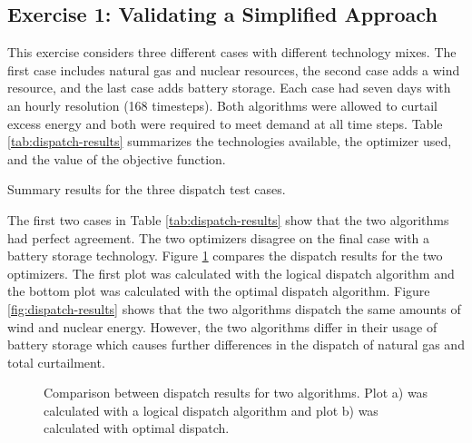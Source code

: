 \subsection{Exercise 1: Validating a Simplified Approach}

This exercise considers three different cases with different technology mixes.
The first case includes natural gas and nuclear resources, the second case adds
a wind resource, and the last case adds battery storage. Each case had seven
days with an hourly resolution (168 timesteps). Both algorithms were allowed to
curtail excess energy and both were required to meet demand at all time steps.
Table \ref{tab:dispatch-results} summarizes the technologies available, the
optimizer used, and the value of the objective function. 

\begin{table}[htbp!]
    \centering
    \caption{Summary results for the three dispatch test cases.}
    \label{tab:dispatch-results}
    
\end{table}

\noindent
The first two cases in Table \ref{tab:dispatch-results} show that the two
algorithms had perfect agreement. The two optimizers disagree on the final case
with a battery storage technology. Figure \ref{fig:dispatch-comparison} compares
the dispatch results for the two optimizers. The first plot was calculated with
the logical dispatch algorithm and the bottom plot was calculated with the
optimal dispatch algorithm. Figure \ref{fig:dispatch-results} shows that the two
algorithms dispatch the same amounts of wind and nuclear energy. However, the
two algorithms differ in their usage of battery storage which causes further
differences in the dispatch of natural gas and total curtailment.

\begin{figure}
    \centering
    \resizebox{0.75\columnwidth}{!}{}
    \caption{Comparison between dispatch results for two algorithms. Plot a) was
    calculated with a logical dispatch algorithm and plot b) was calculated with
    optimal dispatch.}
    \label{fig:dispatch-comparison}
\end{figure}

